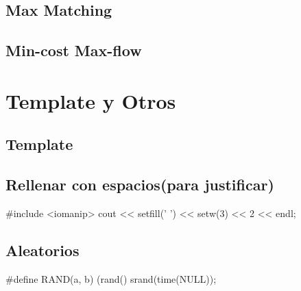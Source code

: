 \subsection{Max Matching}
\subsection{Min-cost Max-flow}

\section{Template y Otros}%
\subsection*{Template}

\subsection*{Rellenar con espacios(para justificar)}
\begin{code}
#include <iomanip>
cout << setfill(' ') << setw(3) << 2 << endl;
\end{code}
\subsection*{Aleatorios}
\begin{code}
#define RAND(a, b) (rand()%
srand(time(NULL));
\end{code}
